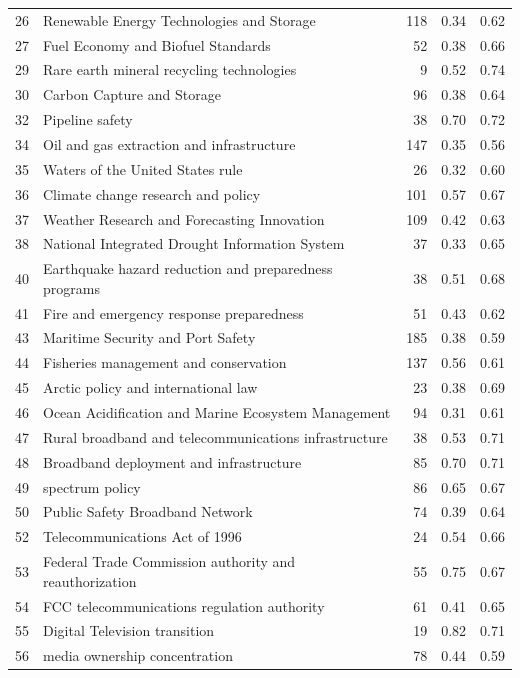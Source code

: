 \begin{longtable}{rlrrr}
26 & Renewable Energy Technologies and Storage & 118 & 0.34 & 0.62 \\
27 & Fuel Economy and Biofuel Standards & 52 & 0.38 & 0.66 \\
29 & Rare earth mineral recycling technologies & 9 & 0.52 & 0.74 \\
30 & Carbon Capture and Storage & 96 & 0.38 & 0.64 \\
32 & Pipeline safety & 38 & 0.70 & 0.72 \\
34 & Oil and gas extraction and infrastructure & 147 & 0.35 & 0.56 \\
35 & Waters of the United States rule & 26 & 0.32 & 0.60 \\
36 & Climate change research and policy & 101 & 0.57 & 0.67 \\
37 & Weather Research and Forecasting Innovation & 109 & 0.42 & 0.63 \\
38 & National Integrated Drought Information System & 37 & 0.33 & 0.65 \\
40 & Earthquake hazard reduction and preparedness programs & 38 & 0.51 & 0.68 \\
41 & Fire and emergency response preparedness & 51 & 0.43 & 0.62 \\
43 & Maritime Security and Port Safety & 185 & 0.38 & 0.59 \\
44 & Fisheries management and conservation & 137 & 0.56 & 0.61 \\
45 & Arctic policy and international law & 23 & 0.38 & 0.69 \\
46 & Ocean Acidification and Marine Ecosystem Management & 94 & 0.31 & 0.61 \\
47 & Rural broadband and telecommunications infrastructure & 38 & 0.53 & 0.71 \\
48 & Broadband deployment and infrastructure & 85 & 0.70 & 0.71 \\
49 & spectrum policy & 86 & 0.65 & 0.67 \\
50 & Public Safety Broadband Network & 74 & 0.39 & 0.64 \\
52 & Telecommunications Act of 1996 & 24 & 0.54 & 0.66 \\
53 & Federal Trade Commission authority and reauthorization & 55 & 0.75 & 0.67 \\
54 & FCC telecommunications regulation authority & 61 & 0.41 & 0.65 \\
55 & Digital Television transition & 19 & 0.82 & 0.71 \\
56 & media ownership concentration & 78 & 0.44 & 0.59 \\

\end{longtable}
